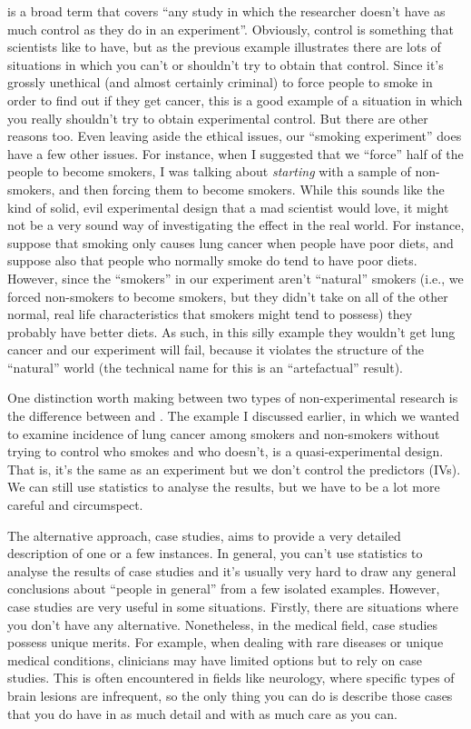 
 is a broad term that covers ``any study in which the researcher doesn't have as much control as they do in an experiment''. Obviously, control is something that scientists like to have, but as the previous example illustrates there are lots of situations in which you can't or shouldn't try to obtain that control. Since it's  grossly unethical (and almost certainly criminal) to force people to smoke in order to find out if they get cancer, this is a good example of a situation in which you really shouldn't try to obtain experimental control. But there are other reasons too. Even leaving aside the ethical issues, our ``smoking experiment'' does have a few other issues. For instance, when I suggested that we ``force'' half of the people to become smokers, I was talking about {\it starting} with a sample of non-smokers, and then forcing them to become smokers. While this sounds like the kind of solid, evil experimental design that a mad scientist would love, it might not be a very sound way of investigating the effect in the real world. For instance, suppose that smoking only causes lung cancer when people have poor diets, and suppose also that people who normally smoke do tend to have poor diets. However, since the ``smokers'' in our experiment aren't ``natural'' smokers (i.e., we forced non-smokers to become smokers, but they didn't take on all of the other normal, real life characteristics that smokers might tend to possess) they probably have better diets. As such, in this silly example they wouldn't get lung cancer and our experiment will fail, because it violates the structure of the ``natural'' world (the technical name for this is an ``artefactual'' result).

One distinction worth making between two types of non-experimental research is the difference between  and . The example I discussed earlier, in which we wanted to examine incidence of lung cancer among smokers and non-smokers without trying to control who smokes and who doesn't, is a quasi-experimental design. That is, it's the same as an experiment but we don't control the predictors (IVs). We can still use statistics to analyse the results, but we have to be a lot more careful and circumspect.

The alternative approach, case studies, aims to provide a very detailed description of one or a few instances. In general, you can't use statistics to analyse the results of case studies and it's usually very hard to draw any general conclusions about ``people in general'' from a few isolated examples. However, case studies are very useful in some situations. Firstly, there are situations where you don't have any alternative. Nonetheless, in the medical field, case studies possess unique merits. For example, when dealing with rare diseases or unique medical conditions, clinicians may have limited options but to rely on case studies. This is often encountered in fields like neurology, where specific types of brain lesions are infrequent, so the only thing you can do is describe those cases that you do have in as much detail and with as much care as you can.

